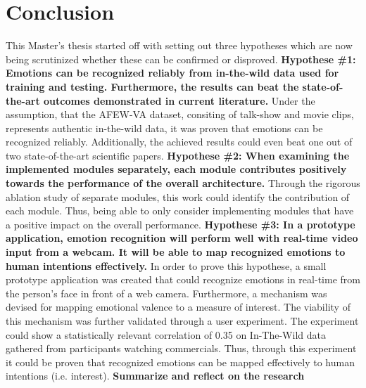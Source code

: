 
\chapter{Conclusion}
This Master's thesis started off with setting out three hypotheses which are now being scrutinized whether these can be confirmed or disproved.\newline\newline
\textbf{Hypothese \#1: Emotions can be recognized reliably from in-the-wild data used for training and testing. Furthermore, the results can beat the state-of-the-art outcomes demonstrated in current literature.}\newline
Under the assumption, that the AFEW-VA dataset, consiting of talk-show and movie clips, represents authentic in-the-wild data, it was proven that emotions can be recognized reliably. Additionally, the achieved results could even beat one out of two state-of-the-art scientific papers.
\newline\newline
\textbf{Hypothese \#2: When examining the implemented modules separately, each module contributes positively towards the performance of the overall architecture.}\newline
Through the rigorous ablation study of separate modules, this work could identify the contribution of each module. Thus, being able to only consider implementing modules that have a positive impact on the overall performance.
\newline\newline
\textbf{Hypothese \#3: In a prototype application, emotion recognition will perform well with real-time video input from a webcam. It will be able to map recognized emotions to human intentions effectively.}\newline
In order to prove this hypothese, a small prototype application was created that could recognize emotions in real-time from the person's face in front of a web camera. Furthermore, a mechanism was devised for mapping emotional valence to a measure of interest. The viability of this mechanism was further validated through a user experiment. The experiment could show a statistically relevant correlation of 0.35 on In-The-Wild data gathered from participants watching commercials. Thus, through this experiment it could be proven that recognized emotions can be mapped effectively to human intentions (i.e. interest).
\newline\newline
\textbf{Summarize and reflect on the research}

